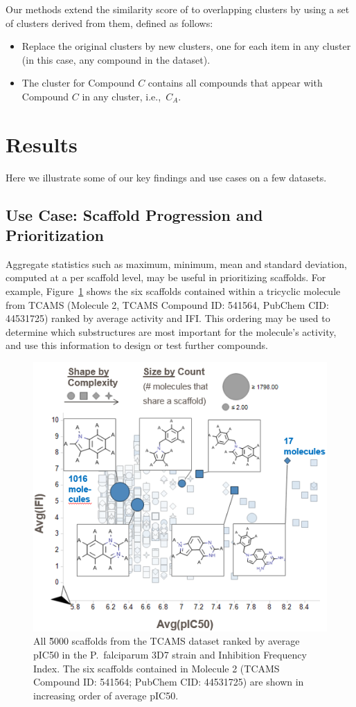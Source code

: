 \documentclass[journal=jacsat,manuscript=article]{achemso}
\newcommand*\fref[1]{Figure~\ref{fig:#1}}
\newcommand*\ie{i.e.,~}
\begin{document}
Our methods extend the similarity score of \citet{Torres2009} to
overlapping clusters by using a set of clusters derived from them,
defined as follows:
\begin{itemize}
\item Replace the original clusters by new clusters, one for each item
  in any cluster (in this case, any compound in the dataset).
\item The cluster for Compound $C$ contains all compounds that appear
  with Compound $C$ in any cluster, \ie $C_A$.
\end{itemize}


\section{Results}
\label{sec:results}
Here we illustrate some of our key findings and use cases on a few datasets. 

\subsection{Use Case: Scaffold Progression and Prioritization}
Aggregate statistics such as maximum, minimum, mean and standard
deviation, computed at a per scaffold level, may be useful in
prioritizing scaffolds. For example, \fref{RGTaggr} shows the six
scaffolds contained within a tricyclic molecule from TCAMS (Molecule
2, TCAMS Compound ID: 541564, PubChem CID: 44531725)
ranked by average activity and IFI. This ordering may
be used to determine which substructures are most important for the
molecule's activity, and use this information to design or test
further compounds.

\begin{figure}
  \includegraphics[width=5in]{fig/RGT_aggr_prop2.png}
  \caption{All \~5000 scaffolds from the TCAMS dataset ranked by
    average pIC50 in the P.~falciparum 3D7 strain and Inhibition
    Frequency Index. The six scaffolds contained in Molecule 2
    (TCAMS Compound ID: 541564; PubChem CID: 44531725) are shown in increasing
    order of average pIC50.}
\label{fig:RGTaggr}   
\end{figure}
\end{document}
